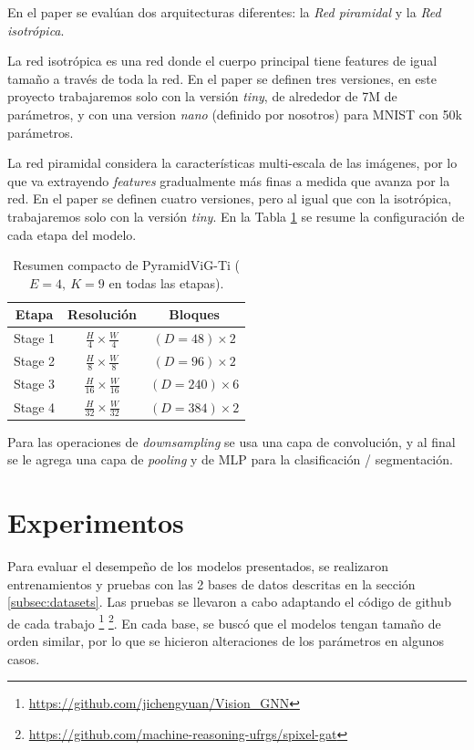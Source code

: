 \documentclass{article}
\begin{document}
En el paper se evalúan dos arquitecturas diferentes: la \emph{Red piramidal} y la \emph{Red isotrópica}.

La red isotrópica es una red donde el cuerpo principal tiene features de igual tamaño a través de toda la red. En el paper se definen tres versiones, en este proyecto trabajaremos solo con la versión \textit{tiny}, de alrededor de 7M de parámetros, y con una version \textit{nano} (definido por nosotros) para MNIST con 50k parámetros.

La red piramidal considera la características multi-escala de las imágenes, por lo que va extrayendo \textit{features} gradualmente más finas a medida que avanza por la red. En el paper se definen cuatro versiones, pero al igual que con la isotrópica, trabajaremos solo con la versión \textit{tiny}. En la Tabla \ref{tab:pyramidvig_ti_arch} se resume la configuración de cada etapa del modelo.

\begin{table}[htb]
    \centering
    \begin{tabular}{c|c|c}
        Etapa   & Resolución                       & Bloques           \\
        \hline
        Stage 1 & $\frac{H}{4}\times\frac{W}{4}$   & $(D=48)\times 2$  \\
        Stage 2 & $\frac{H}{8}\times\frac{W}{8}$   & $(D=96)\times 2$  \\
        Stage 3 & $\frac{H}{16}\times\frac{W}{16}$ & $(D=240)\times 6$ \\
        Stage 4 & $\frac{H}{32}\times\frac{W}{32}$ & $(D=384)\times 2$ \\
    \end{tabular}
    \caption{Resumen compacto de PyramidViG-Ti (\(E=4,\ K=9\) en todas las etapas).}
    \label{tab:pyramidvig_ti_arch}
\end{table}

Para las operaciones de \textit{downsampling} se usa una capa de convolución, y al final se le agrega una capa de \textit{pooling} y de MLP para la clasificación / segmentación.


\section{Experimentos}
\label{sec:experimentos}
Para evaluar el desempeño de los modelos presentados, se realizaron entrenamientos y pruebas con las 2 bases de datos descritas en la sección \ref{subsec:datasets}. Las pruebas se llevaron a cabo adaptando el código de github de cada trabajo \footnote{\href{https://github.com/jichengyuan/Vision_GNN}{https://github.com/jichengyuan/Vision\_GNN}} \footnote{\href{https://github.com/machine-reasoning-ufrgs/spixel-gat}{https://github.com/machine-reasoning-ufrgs/spixel-gat}}. En cada base, se buscó que el modelos tengan tamaño de orden similar, por lo que se hicieron alteraciones de los parámetros en algunos casos.
\end{document}
